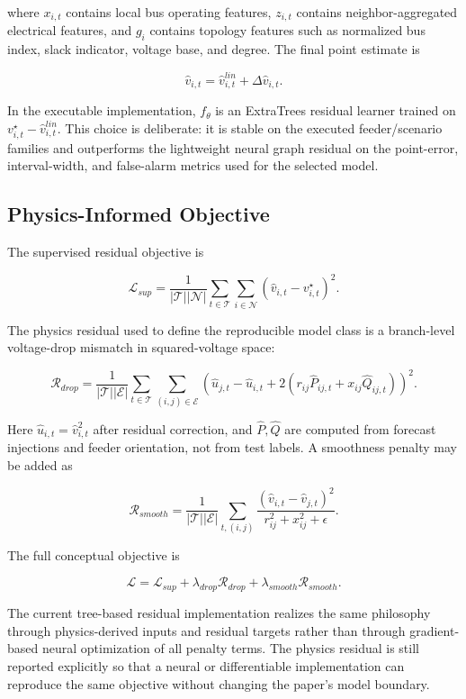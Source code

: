 \documentclass[
  preprint,12pt]{elsarticle}
\begin{document}
where \(x_{i,t}\) contains local bus operating features, \(z_{i,t}\)
contains neighbor-aggregated electrical features, and \(g_i\) contains
topology features such as normalized bus index, slack indicator, voltage
base, and degree. The final point estimate is

\[
\hat v_{i,t} = \hat v^{lin}_{i,t} + \Delta \hat v_{i,t}.
\]

In the executable implementation, \(f_\theta\) is an ExtraTrees residual
learner trained on \(v^\star_{i,t}-\hat v^{lin}_{i,t}\). This choice is
deliberate: it is stable on the executed feeder/scenario families and
outperforms the lightweight neural graph residual on the point-error,
interval-width, and false-alarm metrics used for the selected model.

\subsection{Physics-Informed
Objective}\label{physics-informed-objective}

The supervised residual objective is

\[
\mathcal{L}_{sup}
= \frac{1}{|\mathcal{T}||\mathcal{N}|}
\sum_{t\in\mathcal{T}}\sum_{i\in\mathcal{N}}
\left(\hat v_{i,t}-v^\star_{i,t}\right)^2 .
\]

The physics residual used to define the reproducible model class is a
branch-level voltage-drop mismatch in squared-voltage space:

\[
\mathcal{R}_{drop}
= \frac{1}{|\mathcal{T}||\mathcal{E}|}
\sum_{t\in\mathcal{T}}\sum_{(i,j)\in\mathcal{E}}
\left(
\hat u_{j,t}-\hat u_{i,t}
+2(r_{ij}\hat P_{ij,t}+x_{ij}\hat Q_{ij,t})
\right)^2 .
\]

Here \(\hat u_{i,t}=\hat v_{i,t}^2\) after residual correction, and
\(\hat P,\hat Q\) are computed from forecast injections and feeder
orientation, not from test labels. A smoothness penalty may be added as

\[
\mathcal{R}_{smooth}
= \frac{1}{|\mathcal{T}||\mathcal{E}|}
\sum_{t,(i,j)}
\frac{(\hat v_{i,t}-\hat v_{j,t})^2}{r_{ij}^2+x_{ij}^2+\epsilon}.
\]

The full conceptual objective is

\[
\mathcal{L}
= \mathcal{L}_{sup}
+\lambda_{drop}\mathcal{R}_{drop}
+\lambda_{smooth}\mathcal{R}_{smooth}.
\]

The current tree-based residual implementation realizes the same
philosophy through physics-derived inputs and residual targets rather
than through gradient-based neural optimization of all penalty terms.
The physics residual is still reported explicitly so that a neural or
differentiable implementation can reproduce the same objective without
changing the paper's model boundary.
\end{document}
